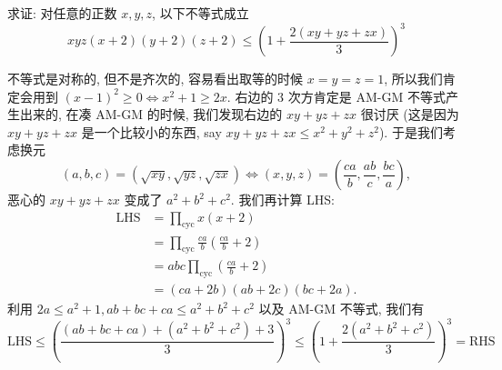 \begin{prob}
\label{prob:prob-11}
求证: 对任意的正数 $x, y, z$, 以下不等式成立
\[
xyz(x + 2)(y + 2)(z + 2) \le
\left(1 + \frac{2(xy + yz + zx)}{3}\right)^3
\]
\end{prob}

\begin{soln}
不等式是对称的, 但不是齐次的,
容易看出取等的时候 $x = y = z = 1$,
所以我们肯定会用到 $(x - 1)^2 \ge 0 \iff x^2 + 1 \ge 2x$.
右边的 $3$ 次方肯定是 AM-GM 不等式产生出来的,
在凑 AM-GM 的时候, 我们发现右边的 $xy + yz + zx$ 很讨厌
(这是因为 $xy + yz + zx$ 是一个比较小的东西,
say $xy + yz + zx \le x^2 + y^2 + z^2$).
于是我们考虑换元
\[
(a, b, c) = (\sqrt{xy}, \sqrt{yz}, \sqrt{zx})
\iff
(x, y, z) = \left(\frac{ca}{b}, \frac{ab}{c}, \frac{bc}{a}\right),
\]
恶心的 $xy + yz + zx$ 变成了 $a^2 + b^2 + c^2$.
我们再计算 LHS:
\begin{align*}
\text{LHS} &= \prod_{\text{cyc}} x(x+2) \\
           &= \prod_{\text{cyc}} \frac{ca}{b}\left(\frac{ca}{b} + 2\right) \\
           &= abc\prod_{\text{cyc}}\left(\frac{ca}{b} + 2\right) \\
           &= (ca + 2b)(ab + 2c)(bc + 2a).
\end{align*}
利用 $2a \le a^2 + 1, ab + bc + ca \le a^2 + b^2 + c^2$
以及 AM-GM 不等式, 我们有
\[
\text{LHS} \le \left(\frac{(ab + bc + ca) + (a^2 + b^2 + c^2) + 3}{3}\right)^3
\le \left(1 + \frac{2(a^2 + b^2 + c^2)}{3}\right)^3
= \text{RHS}
\]
\end{soln}
